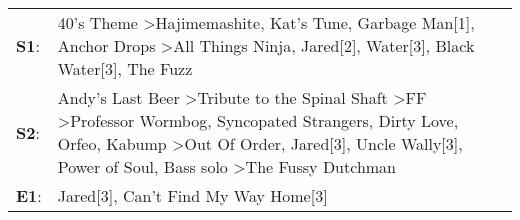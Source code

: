 \begin{supertabular}{p{0.03\textwidth}p{0.92\textwidth}}
 \textbf{S1}:  &                                                                                                                                                                                                                          40's Theme\textsuperscript{} \textgreater \enspace Hajimemashite\textsuperscript{}, \enspace Kat's Tune\textsuperscript{}, \enspace Garbage Man[1]\textsuperscript{}, \enspace Anchor Drops\textsuperscript{} \textgreater \enspace All Things Ninja\textsuperscript{}, \enspace Jared[2]\textsuperscript{}, \enspace Water[3]\textsuperscript{}, \enspace Black Water[3]\textsuperscript{}, \enspace The Fuzz\textsuperscript{}  \enspace  \\
 \textbf{S2}:  &  Andy's Last Beer\textsuperscript{} \textgreater \enspace Tribute to the Spinal Shaft\textsuperscript{} \textgreater \enspace FF\textsuperscript{} \textgreater \enspace Professor Wormbog\textsuperscript{}, \enspace Syncopated Strangers\textsuperscript{}, \enspace Dirty Love\textsuperscript{}, \enspace Orfeo\textsuperscript{}, \enspace Kabump\textsuperscript{} \textgreater \enspace Out Of Order\textsuperscript{}, \enspace Jared[3]\textsuperscript{}, \enspace Uncle Wally[3]\textsuperscript{}, \enspace Power of Soul\textsuperscript{}, \enspace Bass solo\textsuperscript{} \textgreater \enspace The Fussy Dutchman\textsuperscript{}  \enspace  \\
 \textbf{E1}:  &                                                                                                                                                                                                                                                                                                                                                                                                                                                                                                                                                                          Jared[3]\textsuperscript{}, \enspace Can't Find My Way Home[3]\textsuperscript{}  \enspace  \\
\end{supertabular}
